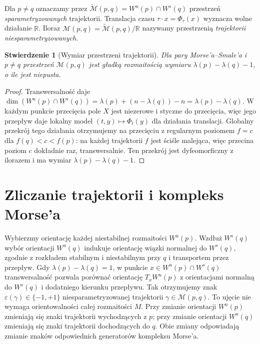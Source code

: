 \documentclass[11pt,a4paper,oneside]{report}
\newcommand{\R}{\mathbb{R}}
\theoremstyle{plain}
\newtheorem{stwierdzenie}[twierdzenie]{Stwierdzenie}
\theoremstyle{definition}
\theoremstyle{remark}
\begin{document}
Dla $p\ne q$ oznaczamy przez
$\widetilde{\mathcal M}(p,q)=W^u(p)\cap W^s(q)$
przestrzeń \emph{sparametryzowanych} trajektorii. Translacja czasu
$\tau\cdot x=\Phi_\tau(x)$ wyznacza wolne działanie $\R$.
Iloraz $\mathcal M(p,q)=\widetilde{\mathcal M}(p,q)/\R$
nazywamy przestrzenią \emph{trajektorii niesparametryzowanych}.

\begin{stwierdzenie}[Wymiar przestrzeni trajektorii]
\label{prop:morse-dimension-v10}
Dla pary Morse'a--Smale'a i $p\ne q$ przestrzeń
$\mathcal M(p,q)$ jest gładką rozmaitością wymiaru
$\lambda(p)-\lambda(q)-1$, o ile jest niepusta.
\end{stwierdzenie}
\begin{proof}
Transwersalność daje
$\dim(W^u(p)\cap W^s(q))=\lambda(p)+(n-\lambda(q))-n
=\lambda(p)-\lambda(q)$.
W każdym punkcie przecięcia pole $X$ jest niezerowe i styczne do
przecięcia, więc jego przepływ daje lokalny model
$(t,y)\mapsto\Phi_t(y)$ dla działania translacji.
Globalny przekrój tego działania otrzymujemy na przecięciu z
regularnym poziomem $f=c$ dla $f(q)<c<f(p)$:
na każdej trajektorii $f$ jest ściśle malejąca, więc przecina
poziom $c$ dokładnie raz, transwersalnie.
Ten przekrój jest dyfeomorficzny z ilorazem i ma wymiar
$\lambda(p)-\lambda(q)-1$.
\end{proof}

\section{Zliczanie trajektorii i kompleks Morse'a}
Wybierzmy orientację każdej niestabilnej rozmaitości $W^u(p)$.
Wzdłuż $W^s(q)$ wybór orientacji $W^u(q)$ indukuje orientację wiązki
normalnej do $W^s(q)$, zgodnie z rozkładem stabilnym i niestabilnym
przy $q$ i transportem przez przepływ. Gdy $\lambda(p)-\lambda(q)=1$,
w punkcie $x\in W^u(p)\cap W^s(q)$ transwersalność pozwala porównać
orientację $T_xW^u(p)$ z orientacjami normalną do $W^s(q)$
i dodatniego kierunku przepływu. Tak otrzymujemy znak
$\varepsilon(\gamma)\in\{-1,+1\}$ niesparametryzowanej
trajektorii $\gamma\in\mathcal M(p,q)$. To ujęcie nie wymaga
orientowalności całej rozmaitości $M$. Przy zmianie orientacji
$W^u(p)$ zmieniają się znaki trajektorii wychodzących z $p$;
przy zmianie orientacji $W^u(q)$ zmieniają się znaki trajektorii
dochodzących do $q$. Obie zmiany odpowiadają zmianie znaków
odpowiednich generatorów kompleksu Morse'a.
\end{document}
